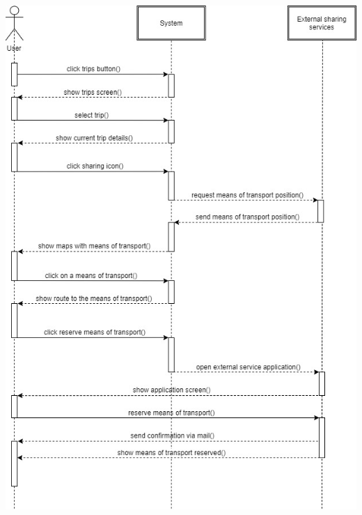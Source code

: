 \begin{center}
\includegraphics[scale=0.55]{MainMatter/images/sequencediagrams/reservesharing}
\end{center}

